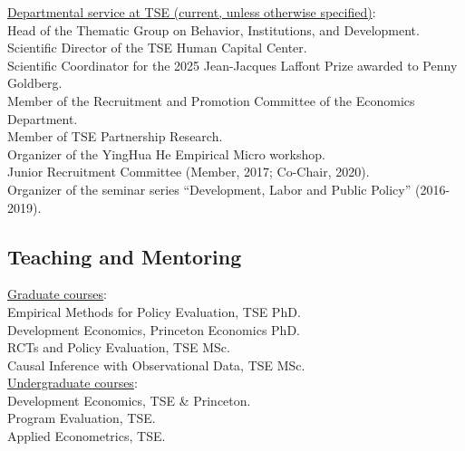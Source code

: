 \documentclass[12pt,english]{article}
\begin{document}
\noindent \underline{Departmental service at TSE (current, unless otherwise specified)}: \\
Head of the Thematic Group on Behavior, Institutions, and Development.\vspace{0.2cm}\\
Scientific Director of the TSE Human Capital Center.\vspace{0.2cm}\\
Scientific Coordinator for the 2025 Jean-Jacques Laffont Prize awarded to Penny Goldberg.\vspace{0.2cm}\\
Member of the Recruitment and Promotion Committee of the Economics Department.\vspace{0.2cm}\\
Member of TSE Partnership Research. \vspace{0.2cm}\\
Organizer of the YingHua He Empirical Micro workshop.\vspace{0.2cm}\\
Junior Recruitment Committee (Member, 2017; Co-Chair, 2020).\vspace{0.2cm}\\
Organizer of the seminar series ``Development, Labor and Public Policy'' (2016-2019).


\subsection*{Teaching and Mentoring}
\underline{Graduate courses}: \\
Empirical Methods for Policy Evaluation, TSE PhD.\vspace{0.2cm} \\
Development Economics, Princeton Economics PhD.\vspace{0.2cm} \\
RCTs and Policy Evaluation, TSE MSc. \vspace{0.2cm} \\
Causal Inference with Observational Data, TSE MSc. \\

\noindent \underline{Undergraduate courses}: \\
Development Economics, TSE \& Princeton. \vspace{0.2cm}\\
Program Evaluation, TSE. \vspace{0.2cm}\\
Applied Econometrics, TSE. \\
\end{document}
